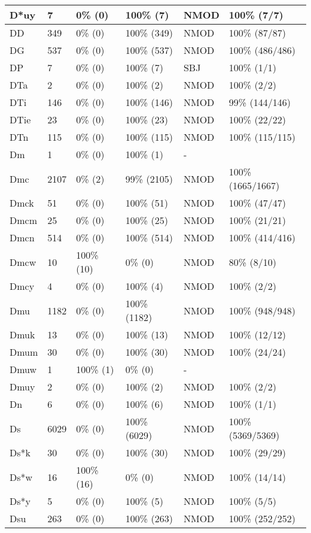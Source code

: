\begin{figure*}
\begin{tabular}{|l|l|l|l||l|l|}
\hline
 D*uy & 7 & 0\% (0) & 100\% (7) & NMOD & 100\% (7/7) \\ 
\hline
 DD & 349 & 0\% (0) & 100\% (349) & NMOD & 100\% (87/87) \\ 
\hline
 DG & 537 & 0\% (0) & 100\% (537) & NMOD & 100\% (486/486) \\ 
\hline
 DP & 7 & 0\% (0) & 100\% (7) & SBJ & 100\% (1/1) \\ 
\hline
 DTa & 2 & 0\% (0) & 100\% (2) & NMOD & 100\% (2/2) \\ 
\hline
 DTi & 146 & 0\% (0) & 100\% (146) & NMOD & 99\% (144/146) \\ 
\hline
 DTie & 23 & 0\% (0) & 100\% (23) & NMOD & 100\% (22/22) \\ 
\hline
 DTn & 115 & 0\% (0) & 100\% (115) & NMOD & 100\% (115/115) \\ 
\hline
 Dm & 1 & 0\% (0) & 100\% (1) & - &  \\ 
\hline
 Dmc & 2107 & 0\% (2) & 99\% (2105) & NMOD & 100\% (1665/1667) \\ 
\hline
 Dmck & 51 & 0\% (0) & 100\% (51) & NMOD & 100\% (47/47) \\ 
\hline
 Dmcm & 25 & 0\% (0) & 100\% (25) & NMOD & 100\% (21/21) \\ 
\hline
 Dmcn & 514 & 0\% (0) & 100\% (514) & NMOD & 100\% (414/416) \\ 
\hline
 Dmcw & 10 & 100\% (10) & 0\% (0) & NMOD & 80\% (8/10) \\ 
\hline
 Dmcy & 4 & 0\% (0) & 100\% (4) & NMOD & 100\% (2/2) \\ 
\hline
 Dmu & 1182 & 0\% (0) & 100\% (1182) & NMOD & 100\% (948/948) \\ 
\hline
 Dmuk & 13 & 0\% (0) & 100\% (13) & NMOD & 100\% (12/12) \\ 
\hline
 Dmum & 30 & 0\% (0) & 100\% (30) & NMOD & 100\% (24/24) \\ 
\hline
 Dmuw & 1 & 100\% (1) & 0\% (0) & - &  \\ 
\hline
 Dmuy & 2 & 0\% (0) & 100\% (2) & NMOD & 100\% (2/2) \\ 
\hline
 Dn & 6 & 0\% (0) & 100\% (6) & NMOD & 100\% (1/1) \\ 
\hline
 Ds & 6029 & 0\% (0) & 100\% (6029) & NMOD & 100\% (5369/5369) \\ 
\hline
 Ds*k & 30 & 0\% (0) & 100\% (30) & NMOD & 100\% (29/29) \\ 
\hline
 Ds*w & 16 & 100\% (16) & 0\% (0) & NMOD & 100\% (14/14) \\ 
\hline
 Ds*y & 5 & 0\% (0) & 100\% (5) & NMOD & 100\% (5/5) \\ 
\hline
 Dsu & 263 & 0\% (0) & 100\% (263) & NMOD & 100\% (252/252) \\ 
\hline
\end{tabular}
\end{figure*}
